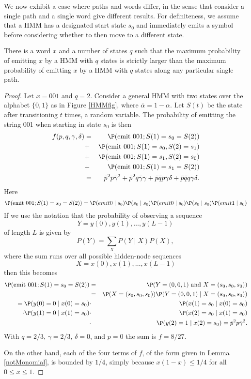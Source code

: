 		We now exhibit a case where paths and words differ, in the sense that consider a single path and a single word give different results.
		For definiteness, we assume that a HMM has a designated start state $s_0$ and immediately emits a symbol before considering whether to then move to a different state.
		\begin{thm}\label{001}
			There is a word $x$ and a number of states $q$ such that
			the maximum probability of emitting $x$ by a HMM with $q$ states is strictly larger than
			the maximum probability of emitting $x$ by a HMM with $q$ states along any particular single path.
		\end{thm}
		\begin{proof}
		Let $x=001$ and $q=2$. Consider a general HMM with two states over the alphabet $\{0,1\}$ as in Figure \ref{HMMfig}, where $\bar \alpha=1-\alpha$.
			Let $S(t)$ be the state after transitioning $t$ times, a random variable.
			The probability of emitting the string 001 when starting in state $s_0$ is then
			\begin{eqnarray*}
				f(p,q,\gamma,\delta)&=&\P(\text{emit }001; S(1)=s_0=S(2))\\
				&+&\P(\text{emit }001; S(1)=s_0, S(2)=s_1)\\
				&+&\P(\text{emit }001; S(1)=s_1, S(2)=s_0)\\
				&+&\P(\text{emit }001; S(1)=s_1=S(2))\\
				&=&\bar p^2 p \bar\gamma^2 + \bar p^2q\bar\gamma\gamma + \bar p\bar q p\gamma\delta + \bar p\bar q q \gamma\bar\delta.
			\end{eqnarray*}
			Here
			\[
				\P(\text{emit }001; S(1)=s_0=S(2))=\P(emit 0\mid s_0)\P(s_0\mid s_0)\P(emit 0\mid s_0)\P(s_0\mid s_0)\P(emit 1\mid s_0)
			\]
			If we use the notation that the probability of observing a sequence
			 \[Y=y(0), y(1),\dots,y(L-1)\,\]
			of length $L$ is given by
			\[P(Y)=\sum_{X}P(Y\mid X)P(X),\,\]
			where the sum runs over all possible hidden-node sequences
			\[X=x(0), x(1), \dots, x(L-1)\]
			then this becomes
			\begin{eqnarray*}
				\P(\text{emit }001; S(1)=s_0=S(2))
				&=& \P(Y=(0,0,1)\text{ and }X=(s_0,s_0,s_0))\\
				&=& \P(X=(s_0,s_0,s_0))\P(Y=(0,0,1)\mid X=(s_0,s_0,s_0)) \\
				=      \P(y(0)=0\mid x(0)=s_0)
				&\cdot&\P(x(1)=s_0\mid x(0)=s_0)\\
				\cdot\P(y(1)=0\mid x(1)=s_0)
				&\cdot&\P(x(2)=s_0\mid x(1)=s_0)\\
				&\cdot&\P(y(2)=1\mid x(2)=s_0) = \bar p^2p\bar\gamma^2.
			\end{eqnarray*}
			With $q=2/3$, $\gamma=2/3$, $\delta=0$, and $p=0$ the sum is $f=8/27$.

			On the other hand, each of the four terms of $f$, of the form given in Lemma \ref{notMonomial}, is bounded by $1/4$, simply because $x(1-x)\le 1/4$ for all $0\le x\le 1$.
			\end{proof}
